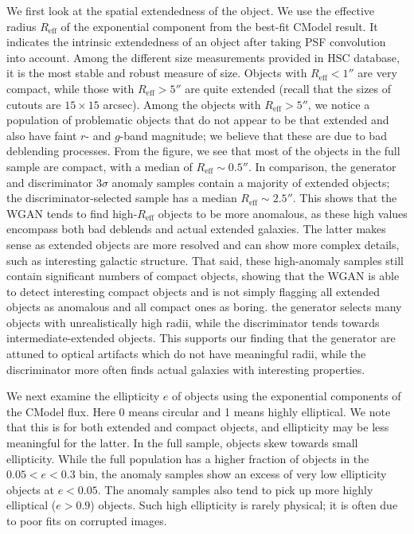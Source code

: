 We first look at the spatial extendedness of the object.
We use the effective radius $R_\mathrm{eff}$ of the exponential component from the best-fit CModel result. 
It indicates the intrinsic extendedness of an object after taking PSF convolution into account. 
Among the different size measurements provided in HSC database, it is the most stable and robust measure of size.
Objects with $R_\mathrm{eff}<1''$ are very compact, while those with $R_\mathrm{eff}>5''$ are quite extended (recall that the sizes of cutouts are $15 \times 15$ arcsec).
Among the objects with $R_\mathrm{eff}>5''$, we notice a population of problematic objects that do not appear to be that extended and also have faint $r$- and $g$-band magnitude; we believe that these are due to bad deblending processes.
From the figure, we see that most of the objects in the full sample are compact, with a median of $R_\mathrm{eff}\sim0.5''$. 
In comparison, the generator and discriminator $3\sigma$ anomaly samples contain a majority of extended objects; the discriminator-selected sample has a median $R_\mathrm{eff}\sim2.5''$.
This shows that the WGAN tends to find high-$R_\mathrm{eff}$ objects to be more anomalous, as these high values encompass both bad deblends and actual extended galaxies.
The latter makes sense as extended objects are more resolved and can show more complex details, such as interesting galactic structure.
That said, these high-anomaly samples still contain significant numbers of compact objects, showing that the WGAN is able to detect interesting compact objects and is not simply flagging all extended objects as anomalous and all compact ones as boring.
 the generator selects many objects with unrealistically high radii, while the discriminator tends towards intermediate-extended objects.
This supports our finding that the generator  are attuned to optical artifacts which do not have meaningful radii, while the discriminator more often finds actual galaxies with interesting properties.

We next examine the ellipticity $e$ of objects using the exponential components of the CModel flux.
Here 0 means circular and 1 means highly elliptical.
We note that this is for both extended and compact objects, and ellipticity may be less meaningful for the latter.
In the full sample, objects skew towards small ellipticity.
While the full population has a higher fraction of objects in the $0.05 < e < 0.3$ bin, the anomaly samples show an excess of very low ellipticity objects at $e < 0.05$.
The anomaly samples also tend to pick up more highly elliptical ($e>0.9$) objects. 
Such high ellipticity is rarely physical; it is often due to poor fits on corrupted images.

